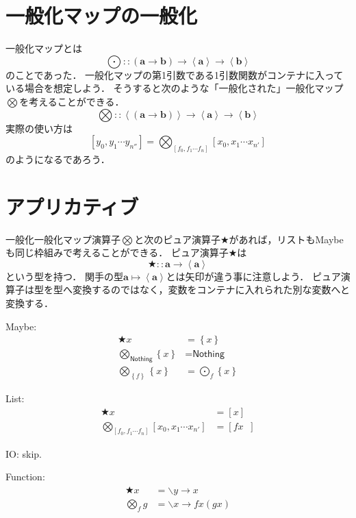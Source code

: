 \documentclass[twocolumn]{jsbook}
\newcommand{\applicativefunc}{\bigotimes}
\newcommand{\guard}[1]{\mathop{\mid_{{#1}}}}
\newcommand{\mapfunc}{\bigodot}
\newcommand{\pure}{\bigstar}
\newcommand{\typename}[1]{\bm{#1}}
\newcommand{\generalcontainer}[1]{\left\langle#1\right\rangle}
\newcommand{\listtype}[1]{\left[#1\right]}
\newcommand{\maybe}[1]{\left\{#1\right\}}
\newcommand{\specialkeyword}[1]{\textsf{#1}}
\newcommand{\nothing}{\specialkeyword{Nothing}}
\begin{document}
\section{一般化マップの一般化}

一般化マップとは$$\mapfunc::(\typename{a}\rightarrow\typename{b})\rightarrow\generalcontainer{\typename{a}}\rightarrow\generalcontainer{\typename{b}}$$のことであった．
一般化マップの第1引数である1引数関数がコンテナに入っている場合を想定しよう．
そうすると次のような「一般化された」一般化マップ$\applicativefunc$を考えることができる．
$$\applicativefunc::\generalcontainer{(\typename{a}\rightarrow\typename{b})}\rightarrow\generalcontainer{\typename{a}}\rightarrow\generalcontainer{\typename{b}}$$
実際の使い方は$$\listtype{y_0,y_1\dotsb y_{n''}}=\applicativefunc_{\listtype{f_0,f_1\dotsb f_n}}\listtype{x_0,x_1\dotsb x_{n'}}$$のようになるであろう．

\section{アプリカティブ}

一般化一般化マップ演算子$\applicativefunc$と次のピュア演算子$\pure$があれば，リストもMaybeも同じ枠組みで考えることができる．
ピュア演算子$\pure$は$$\pure::\typename{a}\rightarrow\generalcontainer{\typename{a}}$$という型を持つ．
関手の型$\typename{a}\mapsto\generalcontainer{\typename{a}}$とは矢印が違う事に注意しよう．
ピュア演算子は型を型へ変換するのではなく，変数をコンテナに入れられた別な変数へと変換する．

Maybe:
\begin{align*}
\pure x&=\maybe{x}\\
\applicativefunc_{\nothing}\maybe{x}&=\nothing\\
\applicativefunc_{\maybe{f}}\maybe{x}&=\mapfunc_f\maybe{x}
\end{align*}

List:
\begin{align*}
\pure x&=\listtype{x}\\
\applicativefunc_{\listtype{f_0,f_1\dotsb f_n}}\listtype{x_0,x_1\dotsb x_{n'}}&=\listtype{fx\guard{f\in\listtype{f_0,f_1\dotsb f_n},x\in\listtype{x_0,x_1\dotsb x_{n'}}}}
\end{align*}

IO: skip.

Function:
\begin{align*}
\pure x&=\backslash y\rightarrow x\\
\applicativefunc_fg&=\backslash x\rightarrow fx(gx)
\end{align*}
\end{document}
